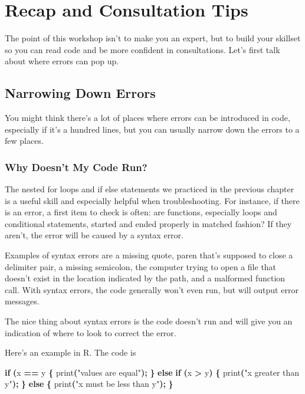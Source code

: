 \documentclass[
]{book}
\newenvironment{Shaded}{\begin{snugshade}}{\end{snugshade}}
\newcommand{\ControlFlowTok}[1]{\textcolor[rgb]{0.13,0.29,0.53}{\textbf{#1}}}
\newcommand{\NormalTok}[1]{#1}
\newcommand{\OperatorTok}[1]{\textcolor[rgb]{0.81,0.36,0.00}{\textbf{#1}}}
\newcommand{\StringTok}[1]{\textcolor[rgb]{0.31,0.60,0.02}{#1}}
\begin{document}
\chapter{Recap and Consultation Tips}\label{recap-and-consultation-tips}

The point of this workshop isn't to make you an expert, but to build your skillset so you can read code and be more confident in consultations. Let's first talk about where errors can pop up.

\section{Narrowing Down Errors}\label{narrowing-down-errors}

You might think there's a lot of places where errors can be introduced in code,
especially if it's a hundred lines, but you can usually narrow down the errors
to a few places.

\subsection{Why Doesn't My Code Run?}\label{why-doesnt-my-code-run}

The nested for loops and if else statements we practiced in the previous chapter is a useful skill and especially helpful when troubleshooting. For instance, if there is an error, a first item to check is often: are functions, especially loops and conditional statements, started and ended properly in matched fashion? If they aren't, the error will be caused by a syntax error.

Examples of syntax errors are a missing quote, paren that's supposed to close a delimiter pair, a
missing semicolon, the computer trying to open a file that doesn't exist in
the location indicated by the path, and a malformed function call. With syntax errors, the
code generally won't even run, but will output error messages.

The nice thing about syntax errors is the code doesn't run and will give
you an indication of where to look to correct the error.

Here's an example in R. The code is

\begin{Shaded}
\begin{Highlighting}[]
\ControlFlowTok{if} \OperatorTok{(}\NormalTok{x }\OperatorTok{==}\NormalTok{ y }\OperatorTok{\{}
\NormalTok{  print}\OperatorTok{(}\StringTok{"values are equal"}\OperatorTok{);}
\OperatorTok{\}} \ControlFlowTok{else} \ControlFlowTok{if} \OperatorTok{(}\NormalTok{x }\OperatorTok{\textgreater{}}\NormalTok{ y}\OperatorTok{)} \OperatorTok{\{}
\NormalTok{  print}\OperatorTok{(}\StringTok{"x greater than y"}\OperatorTok{);}
\OperatorTok{\}} \ControlFlowTok{else} \OperatorTok{\{}
\NormalTok{  print}\OperatorTok{(}\StringTok{"x must be less than y"}\OperatorTok{);}
\OperatorTok{\}}
\end{Highlighting}
\end{Shaded}
\end{document}
